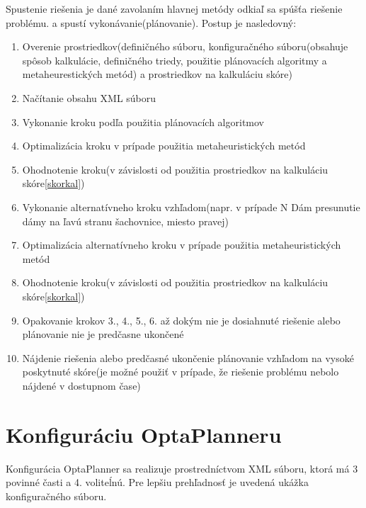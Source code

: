  Spustenie riešenia je dané zavolaním hlavnej metódy odkiaľ sa spúšťa riešenie problému. 
a spustí vykonávanie(plánovanie). Postup je nasledovný:
\begin{enumerate}
\item Overenie prostriedkov(definičného súboru, konfiguračného súboru(obsahuje spôsob kalkulácie, definičného triedy, použitie plánovacích algoritmy a metaheurestických metód) a prostriedkov na kalkuláciu skóre)
\item Načítanie obsahu XML súboru 
\item Vykonanie kroku podľa použitia plánovacích algoritmov
\item Optimalizácia kroku v prípade použitia metaheuristických metód
\item Ohodnotenie kroku(v závislosti od použitia prostriedkov na kalkuláciu skóre\ref{skorkal})
\item Vykonanie alternatívneho kroku vzhľadom(napr. v prípade N Dám presunutie dámy na ľavú stranu šachovnice, miesto pravej)
\item Optimalizácia alternatívneho kroku v prípade použitia metaheuristických metód
\item Ohodnotenie kroku(v závislosti od použitia prostriedkov na kalkuláciu skóre\ref{skorkal})
\item Opakovanie krokov 3., 4., 5., 6. až dokým nie je dosiahnuté riešenie alebo plánovanie nie je predčasne ukončené
\item Nájdenie riešenia alebo predčasné ukončenie plánovanie vzhľadom na vysoké poskytnuté skóre(je možné použiť v prípade, že riešenie problému nebolo nájdené v dostupnom čase)

\end{enumerate}

\newpage
\section{Konfiguráciu OptaPlanneru}\label{confopt}
Konfigurácia OptaPlanner sa realizuje prostredníctvom XML súboru, ktorá má 3 povinné časti a 4. voliteĺnú. Pre lepšiu prehľadnosť je uvedená ukážka konfiguračného súboru. 
    

